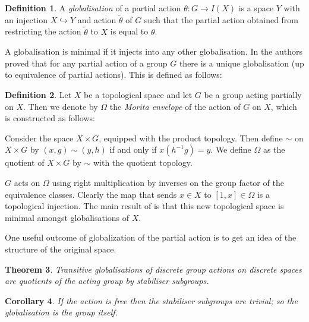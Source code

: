 \documentclass[11pt,a4paper]{amsart}
\theoremstyle{plain}
\newtheorem{theorem}{Theorem}%
\newtheorem{corollary}[theorem]{Corollary}%
\theoremstyle{definition}%
\newtheorem{definition}[theorem]{Definition}%
\theoremstyle{remark}%
\begin{document}
\begin{definition}
A \textit{globalisation} of a partial action $\theta: G \rightarrow I(X)$ is a space $Y$ with an injection $X \hookrightarrow Y$ and action $\tilde{\theta}$ of $G$ such that the partial action obtained from restricting the action $\tilde{\theta}$ to $X$ is equal to $\theta$. 
\end{definition}

A globalisation is minimal if it injects into any other globalisation. In \cite{MR2041539} the authors proved that for any partial action of a group $G$ there is a unique globalisation (up to equivalence of partial actions). This is defined as follows:

\begin{definition}
Let $X$ be a topological space and let $G$ be a group acting partially on $X$. Then we denote by $\Omega$ the \textit{Morita envelope} of the action of $G$ on $X$, which is constructed as follows:

Consider the space $X\times G$, equipped with the product topology. Then define $\sim$ on $X\times G$ by $(x,g)\sim (y,h)$ if and only if $x(h^{-1}g)=y$. We define $\Omega$ as the quotient of $X\times G$ by $\sim$ with the quotient topology. 

$G$ acts on $\Omega$ using right multiplication by inverses on the group factor of the equivalence classes. Clearly the map that sends $x \in X$ to $[1,x] \in \Omega$ is a topological injection. The main result of \cite{MR2041539} is that this new topological space is minimal amongst globalisations of $X$.
\end{definition}

One useful outcome of globalization of the partial action is to get an idea of the structure of the original space.

\begin{theorem}\label{Thm:Free}
Transitive globalisations of discrete group actions on discrete spaces are quotients of the acting group by stabiliser subgroups.
\end{theorem}

\begin{corollary}\label{Cor:FreeTrans}
If the action is free then the stabiliser subgroups are trivial; so the globalisation is the group itself.
\end{corollary}
\end{document}
